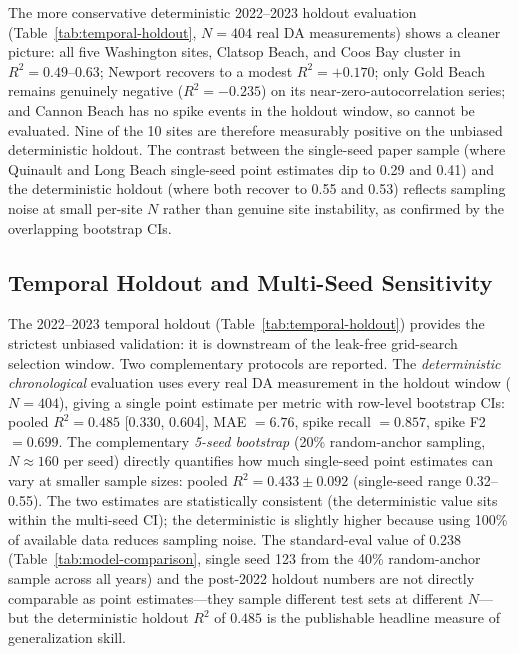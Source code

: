 \documentclass[toxins,article,submit,moreauthors]{Definitions/mdpi}
\begin{document}
The more conservative deterministic 2022--2023 holdout evaluation (Table~\ref{tab:temporal-holdout}, $N = 404$ real DA measurements) shows a cleaner picture: all five Washington sites, Clatsop Beach, and Coos Bay cluster in $R^2 = 0.49$--$0.63$; Newport recovers to a modest $R^2 = +0.170$; only Gold Beach remains genuinely negative ($R^2 = -0.235$) on its near-zero-autocorrelation series; and Cannon Beach has no spike events in the holdout window, so cannot be evaluated. Nine of the 10 sites are therefore measurably positive on the unbiased deterministic holdout. The contrast between the single-seed paper sample (where Quinault and Long Beach single-seed point estimates dip to 0.29 and 0.41) and the deterministic holdout (where both recover to 0.55 and 0.53) reflects sampling noise at small per-site $N$ rather than genuine site instability, as confirmed by the overlapping bootstrap CIs.

\subsection{Temporal Holdout and Multi-Seed Sensitivity}
\label{sec:results-temporal-holdout}

The 2022--2023 temporal holdout (Table~\ref{tab:temporal-holdout}) provides the strictest unbiased validation: it is downstream of the leak-free grid-search selection window. Two complementary protocols are reported. The \emph{deterministic chronological} evaluation uses every real DA measurement in the holdout window ($N = 404$), giving a single point estimate per metric with row-level bootstrap CIs: pooled $R^2 = 0.485$ [0.330, 0.604], MAE $= 6.76$, spike recall $= 0.857$, spike F2 $= 0.699$. The complementary \emph{5-seed bootstrap} (20\% random-anchor sampling, $N \approx 160$ per seed) directly quantifies how much single-seed point estimates can vary at smaller sample sizes: pooled $R^2 = 0.433 \pm 0.092$ (single-seed range 0.32--0.55). The two estimates are statistically consistent (the deterministic value sits within the multi-seed CI); the deterministic is slightly higher because using 100\% of available data reduces sampling noise. The standard-eval value of 0.238 (Table~\ref{tab:model-comparison}, single seed 123 from the 40\% random-anchor sample across all years) and the post-2022 holdout numbers are not directly comparable as point estimates---they sample different test sets at different $N$---but the deterministic holdout $R^2$ of $0.485$ is the publishable headline measure of generalization skill.
\end{document}
